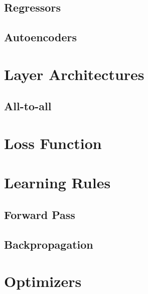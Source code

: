 \documentclass{templates/ucdenverthesis}
\begin{document}
\hypertarget{sec:regressors}{%
\subsection{Regressors}\label{sec:regressors}}

\hypertarget{sec:autoencoders}{%
\subsection{Autoencoders}\label{sec:autoencoders}}

\hypertarget{sec:architectures}{%
\section{Layer Architectures}\label{sec:architectures}}

\hypertarget{sec:all2all}{%
\subsection{All-to-all}\label{sec:all2all}}

\hypertarget{sec:lossfunc}{%
\section{Loss Function}\label{sec:lossfunc}}

\hypertarget{sec:learningrules}{%
\section{Learning Rules}\label{sec:learningrules}}

\hypertarget{sec:fwdpass}{%
\subsection{Forward Pass}\label{sec:fwdpass}}

\hypertarget{sec:backprop}{%
\subsection{Backpropagation}\label{sec:backprop}}

\hypertarget{sec:optimizers}{%
\section{Optimizers}\label{sec:optimizers}}

\printbibliography[heading=bibintoc]
\end{document}
